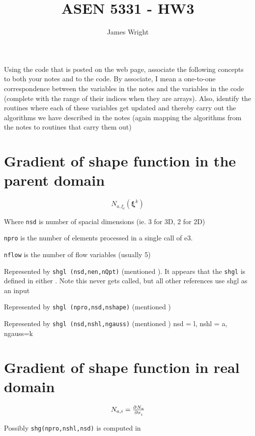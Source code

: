 \documentclass[12pt, letterpaper, twoside]{article}
\title{ASEN 5331 - HW3}
\author{James Wright}
\renewcommand{\vec}[1]{\bm{#1}}
\newcommand{\0}{\vec{0}}
\begin{document}
\maketitle

Using the code that is posted on the web page, associate the following concepts to both your notes and to the code. By associate, I mean a one-to-one correspondence 
between the variables in the notes and the variables in the code (complete with the range of their indices when they are arrays). Also, identify the routines where each 
of these variables get updated and thereby carry out the algorithms we have described in the notes (again mapping the algorithms from the notes to routines that carry them out)


\section{Gradient of shape function in the parent domain}

    \begin{equation}
        N_{a,\xi_l} (\vec{\xi}^k)
    \end{equation}


    Where \texttt{nsd} is number of spacial dimensions (ie. 3 for 3D, 2 for 2D)
    
    \texttt{npro} is the number of elements processed in a single call of e3.

    \texttt{nflow} is the number of flow variables (usually 5)

    Represented by \texttt{shgl (nsd,nen,nQpt)} (mentioned ). 
    It appears that the \texttt{shgl} is defined in either . Note this never gets called, but all other references use shgl as an input

    Represented by \texttt{shgl (npro,nsd,nshape)} (mentioned )

    Represented by \texttt{shgl (nsd,nshl,ngauss)} (mentioned )
    nsd = l, nshl = a, ngauss=k

\section{Gradient of shape function in real domain}

    \begin{equation}
        N_{a,i} = \pd{N_a}{x_i}
    \end{equation}

    Possibly \texttt{shg(npro,nshl,nsd)}  is computed in 
\end{document}
